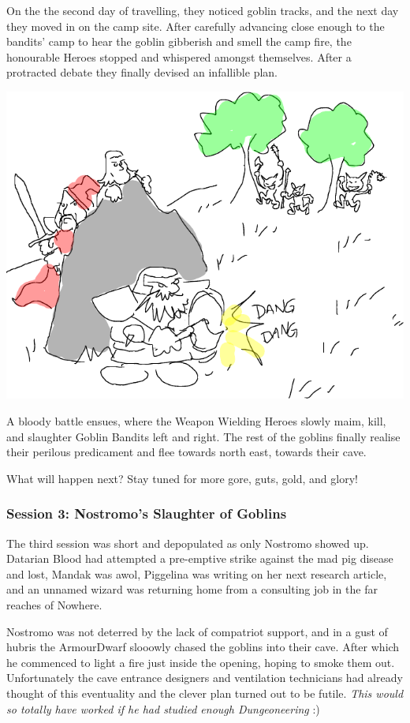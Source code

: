 On the the second day of travelling, they noticed goblin tracks, and the next day they moved in on the camp site. After carefully advancing close enough to the bandits' camp to hear the goblin gibberish and smell the camp fire, the honourable Heroes stopped and whispered amongst themselves. After a protracted debate they finally devised an infallible plan.

\begin{center}
\vspace{0.5 cm}
\includegraphics[width=0.7\linewidth]{./figs/playthrough/sneaky-plan.png}
\vspace{0.5 cm}
\end{center}

A bloody battle ensues, where the Weapon Wielding Heroes slowly maim, kill, and slaughter Goblin Bandits left and right. The rest of the goblins finally realise their perilous predicament and flee towards north east, towards their cave.

What will happen next? Stay tuned for more gore, guts, gold, and glory!


\subsubsection*{Session 3: Nostromo's Slaughter of Goblins}
The third session was short and depopulated as only Nostromo showed up. Datarian Blood had attempted a pre-emptive strike against the mad pig disease and lost, Mandak was awol, Piggelina was writing on her next research article, and an unnamed wizard was returning home from a consulting job in the far reaches of Nowhere.

Nostromo was not deterred by the lack of compatriot support, and in a gust of hubris the ArmourDwarf slooowly chased the goblins into their cave. After which he commenced to light a fire just inside the opening, hoping to smoke them out. Unfortunately the cave entrance designers and ventilation technicians had already thought of this eventuality and the clever plan turned out to be futile. \emph{This would so totally have worked if he had studied enough Dungeoneering} :)

